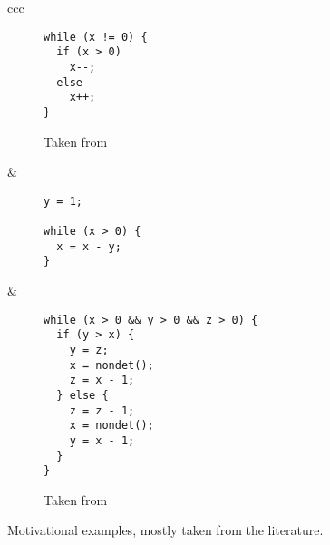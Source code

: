 \documentclass[preprint]{sigplanconf}
\theoremstyle{definition}
\begin{document}
\begin{figure*}
\begin{tabular}{ccc}
\begin{subfigure}[b]{0.3\textwidth}
\begin{lstlisting}
while (x != 0) {
  if (x > 0)
    x--;
  else
    x++;
}
\end{lstlisting}
\caption{Taken from \cite{DBLP:conf/tacas/CookSZ13}}
 \label{fig:motivation.g}
\end{subfigure} 


&

\begin{subfigure}[b]{0.3\textwidth}
\begin{lstlisting}
y = 1;

while (x > 0) {
  x = x - y;
}
\end{lstlisting}
\caption{}
 \label{fig:motivation.h}
\end{subfigure} 


&


\begin{subfigure}[b]{0.3\textwidth}
\begin{lstlisting}
while (x > 0 && y > 0 && z > 0) {
  if (y > x) {
    y = z;
    x = nondet();
    z = x - 1;
  } else {
    z = z - 1;
    x = nondet();
    y = x - 1;
  }
}
\end{lstlisting}
\caption{Taken from~\cite{BA:mcs}}
 \label{fig:motivation.i}
\end{subfigure} 
% 
% 
% 
% 

\end{tabular}
\caption{Motivational examples, mostly taken from the literature.\label{fig:motivation}}
\end{figure*}

\end{document}
